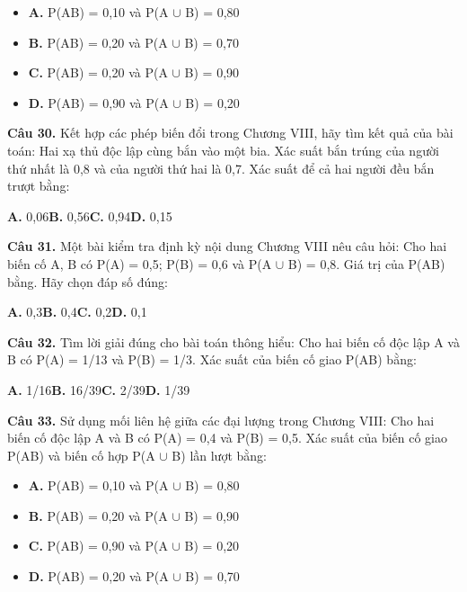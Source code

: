 \documentclass[11pt,a4paper]{article}
\begin{document}
\begin{itemize}\setlength{\itemsep}{1pt}\setlength{\parskip}{0pt}
  \item[] \textbf{A.} P(AB) = 0,10 và P(A $\cup$ B) = 0,80
  \item[] \textbf{B.} P(AB) = 0,20 và P(A $\cup$ B) = 0,70
  \item[] \textbf{C.} P(AB) = 0,20 và P(A $\cup$ B) = 0,90
  \item[] \textbf{D.} P(AB) = 0,90 và P(A $\cup$ B) = 0,20
\end{itemize}\vspace{2pt}
\textbf{\color{primary} Câu 30.} Kết hợp các phép biến đổi trong Chương VIII, hãy tìm kết quả của bài toán: Hai xạ thủ độc lập cùng bắn vào một bia. Xác suất bắn trúng của người thứ nhất là 0,8 và của người thứ hai là 0,7. Xác suất để cả hai người đều bắn trượt bằng:\par
\hspace*{1.5em}\textbf{A.} 0,06\quad\quad \textbf{B.} 0,56\quad\quad \textbf{C.} 0,94\quad\quad \textbf{D.} 0,15\par\vspace{2pt}
\textbf{\color{primary} Câu 31.} Một bài kiểm tra định kỳ nội dung Chương VIII nêu câu hỏi: Cho hai biến cố A, B có P(A) = 0,5; P(B) = 0,6 và P(A $\cup$ B) = 0,8. Giá trị của P(AB) bằng. Hãy chọn đáp số đúng:\par
\hspace*{1.5em}\textbf{A.} 0,3\quad\quad \textbf{B.} 0,4\quad\quad \textbf{C.} 0,2\quad\quad \textbf{D.} 0,1\par\vspace{2pt}
\textbf{\color{primary} Câu 32.} Tìm lời giải đúng cho bài toán thông hiểu: Cho hai biến cố độc lập A và B có P(A) = 1/13 và P(B) = 1/3. Xác suất của biến cố giao P(AB) bằng:\par
\hspace*{1.5em}\textbf{A.} 1/16\quad\quad \textbf{B.} 16/39\quad\quad \textbf{C.} 2/39\quad\quad \textbf{D.} 1/39\par\vspace{2pt}
\textbf{\color{primary} Câu 33.} Sử dụng mối liên hệ giữa các đại lượng trong Chương VIII: Cho hai biến cố độc lập A và B có P(A) = 0,4 và P(B) = 0,5. Xác suất của biến cố giao P(AB) và biến cố hợp P(A $\cup$ B) lần lượt bằng:\par
\begin{itemize}\setlength{\itemsep}{1pt}\setlength{\parskip}{0pt}
  \item[] \textbf{A.} P(AB) = 0,10 và P(A $\cup$ B) = 0,80
  \item[] \textbf{B.} P(AB) = 0,20 và P(A $\cup$ B) = 0,90
  \item[] \textbf{C.} P(AB) = 0,90 và P(A $\cup$ B) = 0,20
  \item[] \textbf{D.} P(AB) = 0,20 và P(A $\cup$ B) = 0,70
\end{itemize}\vspace{2pt}
\end{document}

